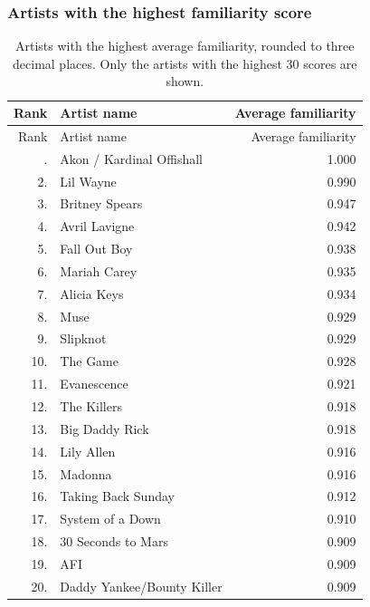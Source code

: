 \documentclass[                                                             %
        12pt,                                                                   %
        twoside                                                                 %
    ]{scrartcl}                                                                 %
\begin{document}
\subsubsection{Artists with the highest familiarity score}

{\footnotesize
\begin{longtabu}{r l r}
    \caption[Artists with the highest average familiarity.]{%
        Artists with the highest average familiarity, 
        rounded to three decimal places.
        Only the artists with the highest 30 scores are shown.
    }
    \label{tab:artists-highest-average-familiarity-b} \\ \toprule
    Rank & Artist name & Average familiarity \\ \midrule
    \endfirsthead
    \toprule
    Rank & Artist name & Average familiarity \\ \midrule
    \endhead
    \bottomrule
    . & Akon / Kardinal Offishall  & 1.000 \\
	 2. & Lil Wayne                  & 0.990 \\
	 3. & Britney Spears             & 0.947 \\
	 4. & Avril Lavigne              & 0.942 \\
	 5. & Fall Out Boy               & 0.938 \\
	 6. & Mariah Carey               & 0.935 \\
	 7. & Alicia Keys                & 0.934 \\
	 8. & Muse                       & 0.929 \\
	 9. & Slipknot                   & 0.929 \\
	10. & The Game                   & 0.928 \\
	11. & Evanescence                & 0.921 \\
	12. & The Killers                & 0.918 \\
	13. & Big Daddy Rick             & 0.918 \\
	14. & Lily Allen                 & 0.916 \\
	15. & Madonna                    & 0.916 \\
	16. & Taking Back Sunday         & 0.912 \\
	17. & System of a Down           & 0.910 \\
	18. & 30 Seconds to Mars         & 0.909 \\
	19. & AFI                        & 0.909 \\
	20. & Daddy Yankee/Bounty Killer & 0.909 \\

\end{longtabu}}
\end{document}
